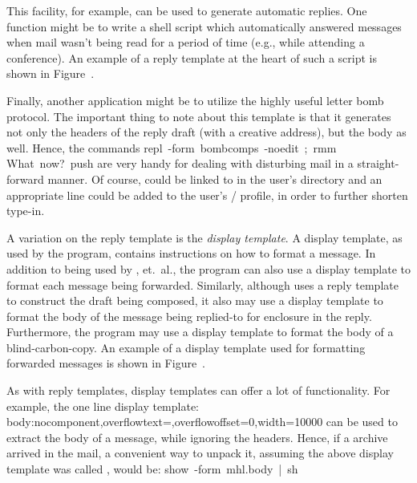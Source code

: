 This facility, for example,
can be used to generate automatic replies.%
One function might be to write a  shell script
which automatically answered messages when mail wasn't being read for a
period of time
(e.g., while attending a conference).
An example of a reply template at the heart of such a script
is shown in Figure~\tripcomps.

Finally,
another application might be to utilize
the highly useful letter bomb protocol.%
The important thing to note about this template is that it generates not only
the headers of the reply draft (with a creative  address),
but the body as well.
Hence,
the commands
\example
    repl\ -form\ bombcomps\ -noedit\ ;\ rmm\\
    What\ now?\ push%
\endexample
are very handy for dealing with disturbing mail in a straight-forward manner.
Of course,  could be linked to  in the user's 
directory and an appropriate line could be added to the user's \MH/ profile,
in order to further shorten type-in.

A variation on the reply template is the {\it display template}.
A display template, as used by the  program,
contains instructions on how to format a message.
In addition to being used by , et.~al.,
the  program can also use a display template to format each
message being forwarded.
Similarly,
although  uses a reply template to construct the draft
being composed,
it also may use a display template to format the body of the message
being replied-to for enclosure in the reply.
Furthermore,
the  program may use a display template to format the body of a
blind-carbon-copy.
An example of a display template used for formatting forwarded messages
is shown in Figure~\mhlforward.

As with reply templates,
display templates can offer a lot of functionality.
For example,
the one line display template:
\example
    body:nocomponent,overflowtext=,overflowoffset=0,width=10000%
\endexample
can be used to extract the body of a message,
while ignoring the headers.
Hence,
if a  archive arrived in the mail,
a convenient way to unpack it,
assuming the above display template was called ,
would be:
\example show\ -form\ mhl.body\ |\ sh\endexample

